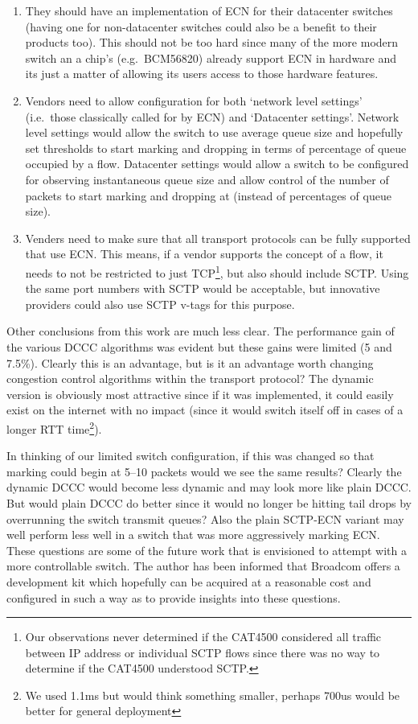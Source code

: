 \documentclass[12pt]{article}
\begin{document}
\begin{enumerate}

\item They should have an implementation of ECN for their datacenter switches (having one
for non-datacenter switches could also be a benefit to their products too). This
should not be too hard since many of the more modern switch an a chip's (e.g.~BCM56820)
already support ECN in hardware and its just a matter of allowing its users access to those
hardware features.

\item Vendors need to allow configuration for both `network level settings' (i.e.~those classically called
for by ECN) and `Datacenter settings'. Network level settings would allow the switch to use average queue
size and hopefully set thresholds to start marking and dropping in terms of percentage of queue occupied by
a flow. Datacenter settings would allow a switch to be configured for observing instantaneous queue size
and allow control of the number of packets to start marking and dropping at (instead of percentages of
queue size).

\item Venders need to make sure that all transport protocols can be fully supported that use ECN. This
means, if a vendor supports the concept of a flow, it needs to not be restricted to just TCP\footnote{Our observations
never determined if the CAT4500 considered all traffic between IP address or individual SCTP flows since there was
no way to determine if the CAT4500 understood SCTP.}, but also should include SCTP. Using the same port
numbers with SCTP would be acceptable, but innovative providers could also use SCTP v-tags for this purpose.

\end{enumerate}

Other conclusions from this work are much less clear. The performance gain of the various DCCC algorithms
was evident but these gains were limited (5 and 7.5\%). Clearly this is an advantage, but is it an advantage
worth changing congestion control algorithms within the transport protocol? The dynamic version is obviously most
attractive since if it was implemented, it could easily exist on the internet with no impact (since it would switch itself
off in cases of a longer RTT time\footnote{We used 1.1ms but would think something smaller, perhaps 700us would
be better for general deployment}). 

In thinking of our limited switch configuration, if this was changed so that marking could begin at 5--10 packets
would we see the same results? Clearly the dynamic DCCC would become less dynamic and may look more
like plain DCCC. But would plain DCCC do better since it would no longer be hitting tail drops 
by overrunning the switch transmit queues? Also the plain SCTP-ECN variant may well perform less well 
in a switch that was more aggressively marking ECN. These questions are some of the future work that
is envisioned to attempt with a more controllable switch. The author has been informed that Broadcom
offers a development kit which hopefully can be acquired at a reasonable cost and configured in such
a way as to provide insights into these questions.
     
\end{document}
